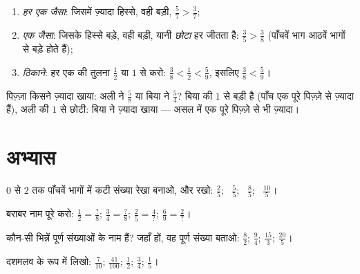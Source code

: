 \begin{method}[तुलना के तीन औज़ार]\label{met:g5:fractions:compare}
\begin{enumerate}
  \item \emph{हर एक जैसा}: जिसमें ज़्यादा हिस्से, वही बड़ी,
        $\frac57 > \frac37$;
  \item \emph{ एक जैसा}: जिसके हिस्से बड़े, वही बड़ी, यानी
        \emph{छोटा} हर जीतता है: $\frac35 > \frac38$ (पाँचवें
        भाग आठवें भागों से बड़े होते हैं);
  \item \emph{ठिकाने}: हर एक की तुलना $\frac12$ या $1$ से करो:
        $\frac38 < \frac12 < \frac59$, इसलिए $\frac38 < \frac59$।
\end{enumerate}
\end{method}

\begin{example}\label{ex:g5:fractions:compare}
पिज़्ज़ा किसने ज़्यादा खाया: अली ने $\frac58$ या बिया ने
$\frac54$? बिया की  $1$ से बड़ी है (पाँच  एक पूरे
पिज़्ज़े से ज़्यादा हैं), अली की $1$ से छोटी: बिया ने ज़्यादा
खाया --- असल में एक पूरे पिज़्ज़े से भी ज़्यादा।
\end{example}

\section{अभ्यास}

\begin{exercise}[$\star$]\label{exo:g5:fractions:1}
$0$ से $2$ तक पाँचवें भागों में कटी संख्या रेखा बनाओ, और रखो:
$\frac25$; \ $\frac55$; \ $\frac85$; \ $\frac{10}{5}$।
\end{exercise}

\begin{exercise}[$\star$]\label{exo:g5:fractions:2}
बराबर नाम पूरे करो:
$\frac12 = \frac{?}{8}$; \quad
$\frac34 = \frac{?}{8}$; \quad
$\frac{2}{5} = \frac{4}{?}$; \quad
$\frac{6}{9} = \frac{2}{?}$।
\end{exercise}

\begin{exercise}[$\star$]\label{exo:g5:fractions:3}
कौन-सी भिन्नें पूर्ण संख्याओं के नाम हैं? जहाँ हों, वह पूर्ण
संख्या बताओ: $\frac82$; \quad $\frac{9}{4}$; \quad
$\frac{15}{3}$; \quad $\frac{20}{5}$।
\end{exercise}

\begin{exercise}[$\star$]\label{exo:g5:fractions:4}
दशमलव के रूप में लिखो: $\frac{7}{10}$; \quad $\frac{41}{100}$; \quad
$\frac12$; \quad $\frac34$; \quad $\frac15$।
\end{exercise}

